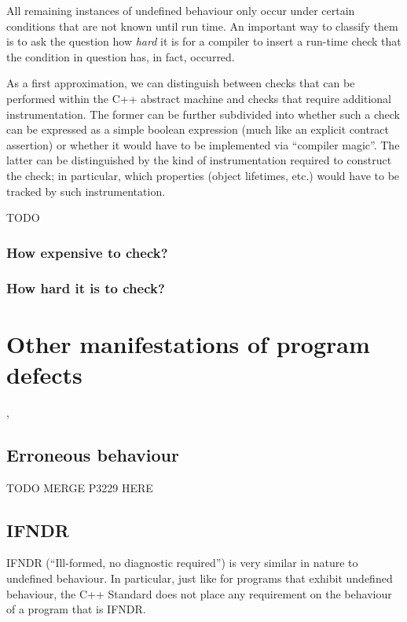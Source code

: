 All remaining instances of undefined behaviour only occur under certain conditions that are not known until run time. An important way to classify them is to ask the question how \emph{hard} it is for a compiler to insert a run-time check that the condition in question has, in fact, occurred.

As a first approximation, we can distinguish between checks that can be performed within the C++ abstract machine and checks that require additional instrumentation. The former can be further subdivided into whether such a check can be expressed as a simple boolean expression (much like an explicit contract assertion) %
or whether it would have to be implemented via ``compiler magic''. The latter can be distinguished by the kind of instrumentation required to construct the check; in particular, which properties (object lifetimes, etc.) would have to be tracked by such instrumentation.

TODO 

\subsubsection{How expensive to check?}


\subsubsection{How hard it is to check?}


\section{Other manifestations of program defects}
\label{otherdefects},

\subsection{Erroneous behaviour}
\label{eb}

TODO MERGE P3229 HERE


\subsection{IFNDR}

IFNDR (``Ill-formed, no diagnostic required'') is very similar in nature to undefined behaviour. In particular, just like for programs that exhibit undefined behaviour, the C++ Standard does not place any requirement on the behaviour of a program that is IFNDR.

